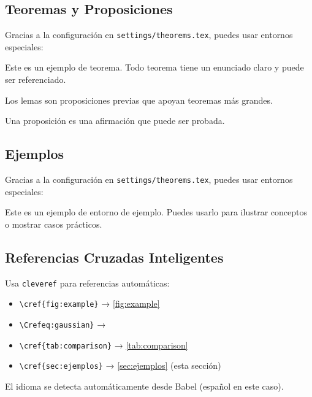 \documentclass[/work/src/main.tex]{subfiles}
\begin{document}
\subsection{Teoremas y Proposiciones}
Gracias a la configuración en \texttt{settings/theorems.tex}, puedes usar entornos especiales:

\begin{theorem}
    Este es un ejemplo de teorema. Todo teorema tiene un enunciado claro y puede ser referenciado.
\end{theorem}

\begin{lemma}
    Los lemas son proposiciones previas que apoyan teoremas más grandes.
\end{lemma}

\begin{proposition}
    Una proposición es una afirmación que puede ser probada.
\end{proposition}

\subsection{Ejemplos}
Gracias a la configuración en \texttt{settings/theorems.tex}, puedes usar entornos especiales:
\begin{example}
    Este es un ejemplo de entorno de ejemplo. Puedes usarlo para ilustrar conceptos o mostrar casos prácticos.
\end{example}

\subsection{Referencias Cruzadas Inteligentes}
Usa \texttt{cleveref} para referencias automáticas:

\begin{itemize}
    \item \texttt{\textbackslash cref\{fig:example\}} → \cref{fig:example}
    \item \texttt{\textbackslash Cref{eq:gaussian}\}} → 
    \item \texttt{\textbackslash cref\{tab:comparison\}} → \cref{tab:comparison}
    \item \texttt{\textbackslash cref\{sec:ejemplos\}} → \cref{sec:ejemplos} (esta sección)
\end{itemize}

El idioma se detecta automáticamente desde Babel (español en este caso).
\end{document}
